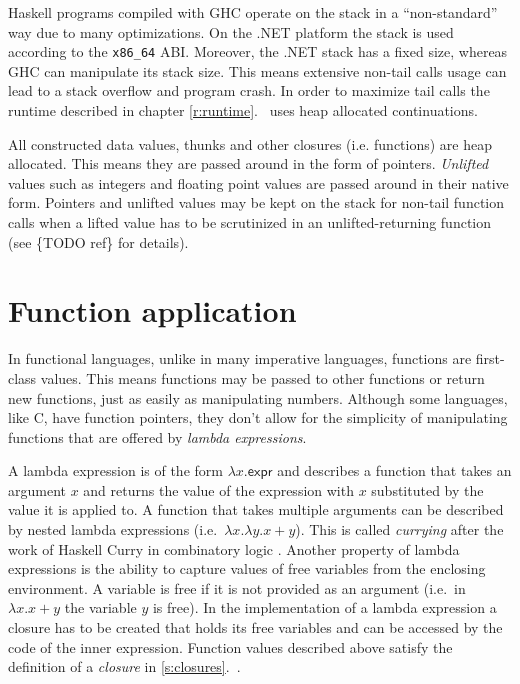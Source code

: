 \documentclass[en]{pracamgr}
\newcommand{\myref}[1]{\ref{#1}.~\nameref{#1}}
\begin{document}
Haskell programs compiled with GHC operate on the stack in a ``non-standard'' way
due to many optimizations. On the .NET platform the stack is used according to the
\texttt{x86\_64} ABI. Moreover, the .NET stack has a fixed size, whereas GHC can manipulate its stack size.
This means extensive non-tail calls usage can lead to a stack overflow and program crash.
In order to maximize tail calls the runtime described in chapter \myref{r:runtime}
uses heap allocated continuations.

All constructed data values, thunks and other closures (i.e. functions) are heap allocated.
This means they are passed around in the form of pointers.
\textit{Unlifted} values such as integers and floating point values
are passed around in their native form.
Pointers and unlifted values may be kept on the stack
for non-tail function calls when a lifted value has to be scrutinized in
an unlifted-returning function (see \{TODO ref\} for details).

\chapter{Function application}\label{r:funApp}

In functional languages, unlike in many imperative languages,
functions are first-class values. This means functions may be passed
to other functions or return new functions, just as easily as manipulating
numbers. Although some languages, like C, have function pointers, they don't
allow for the simplicity of manipulating functions that are offered
by \textit{lambda expressions}.

A lambda expression is of the form $\lambda x. \mathsf{expr}$ and describes
a function that takes an argument $x$ and returns the value of the expression
with $x$ substituted by the value it is applied to. A function that takes
multiple arguments can be described by nested lambda expressions
(i.e.~$\lambda x.\lambda y. x+y$). This is called \textit{currying} after
the work of Haskell Curry in combinatory logic \cite{Curry}.
Another property of lambda expressions is the ability to capture
values of free variables from the enclosing environment.
A variable is free if it is not provided as an argument
(i.e.~in~$\lambda x. x + y$ the variable $y$ is free).
In the implementation of a lambda expression a closure has to
be created that holds its free variables and can be accessed by the
code of the inner expression. Function values described above satisfy
the definition of a \textit{closure} in \myref{s:closures}.
\end{document}

